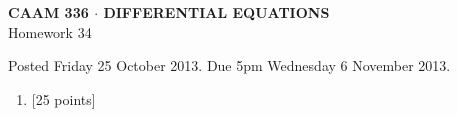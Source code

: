 \documentclass[10pt]{article}
\begin{document}
\vspace*{-5em}
\begin{center}
\large \textsf{\textbf{CAAM 336 $\cdot$ DIFFERENTIAL EQUATIONS}\\[0.5em]
Homework 34 }
\end{center}

Posted Friday 25 October 2013.  Due 5pm Wednesday 6 November 2013.

\begin{enumerate}\addtocounter{enumi}{33}
\item {[25 points]}  
\end{enumerate}
\end{document}
